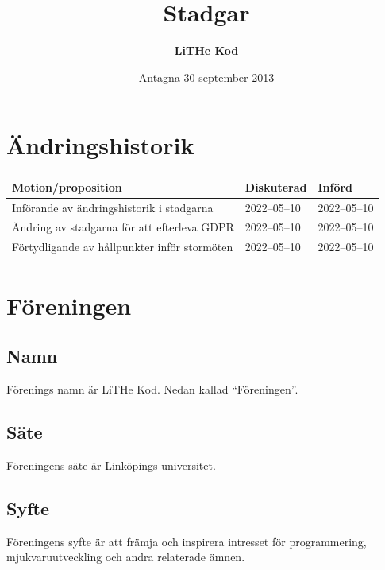 \documentclass[11pt,a4paper]{article}
\title{\textbf{Stadgar}}
\date{Antagna 30 september 2013}
\author{\textbf{LiTHe Kod}}
\begin{document}
\maketitle
\thispagestyle{empty}
\pagebreak
\tableofcontents
\pagebreak

\section*{Ändringshistorik}
\begin{tabularx}{\textwidth}{X l l}
    \bfseries Motion/proposition & \bfseries Diskuterad & \bfseries Införd \\\hline
    \vspace{-0.6em} %
    Införande av ändringshistorik i stadgarna & 2022--05--10 & 2022--05--10 \\
    Ändring av stadgarna för att efterleva GDPR & 2022--05--10 & 2022--05--10 \\
    Förtydligande av hållpunkter inför stormöten & 2022--05--10 & 2022--05--10 \\
\end{tabularx}
\pagebreak

\pagestyle{fancy}

\section{Föreningen}
\subsection{Namn}
Förenings namn är LiTHe Kod. Nedan kallad ``Föreningen''.
\subsection{Säte}
Föreningens säte är Linköpings universitet.
\subsection{Syfte}\label{sec:syfte}
Föreningens syfte är att främja och inspirera intresset för programmering, mjukvaruutveckling och andra relaterade ämnen.
\end{document}
